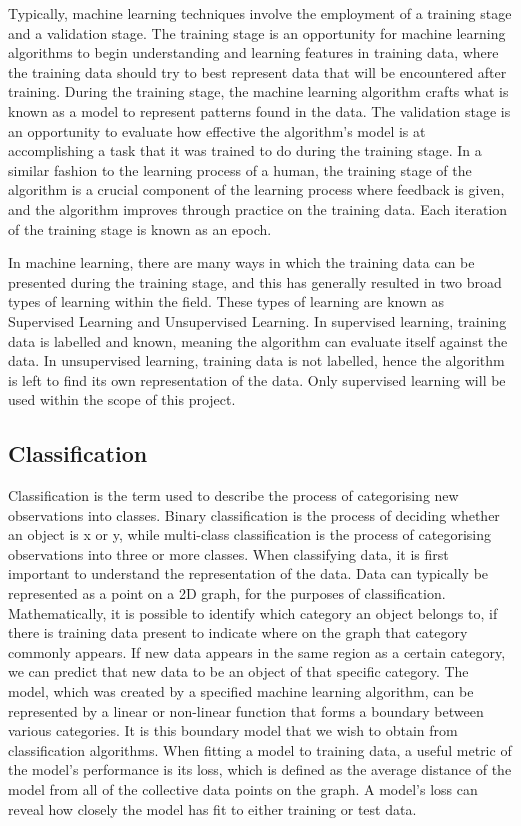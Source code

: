 \documentclass{l4proj}
\begin{document}
Typically, machine learning techniques involve the employment of a training stage and a validation stage.
The training stage is an opportunity for machine learning algorithms to begin understanding and learning features in training data, where the training data should try to best represent data that will be encountered after training.
During the training stage, the machine learning algorithm crafts what is known as a model to represent patterns found in the data.
The validation stage is an opportunity to evaluate how effective the algorithm's model is at accomplishing a task that it was trained to do during the training stage.
In a similar fashion to the learning process of a human, the training stage of the algorithm is a crucial component of the learning process where feedback is given, and the algorithm improves through practice on the training data.
Each iteration of the training stage is known as an epoch.

In machine learning, there are many ways in which the training data can be presented during the training stage, and this has generally resulted in two broad types of learning within the field. 
These types of learning are known as Supervised Learning and Unsupervised Learning. 
In supervised learning, training data is labelled and known, meaning the algorithm can evaluate itself against the data. 
In unsupervised learning, training data is not labelled, hence the algorithm is left to find its own representation of the data.
Only supervised learning will be used within the scope of this project. 

\subsection{Classification}
Classification is the term used to describe the process of categorising new observations into classes.
Binary classification is the process of deciding whether an object is x or y, while multi-class classification is the process of categorising observations into three or more classes.
When classifying data, it is first important to understand the representation of the data.
Data can typically be represented as a point on a 2D graph, for the purposes of classification.
Mathematically, it is possible to identify which category an object belongs to, if there is training data present to indicate where on the graph that category commonly appears.
If new data appears in the same region as a certain category, we can predict that new data to be an object of that specific category.
The model, which was created by a specified machine learning algorithm, can be represented by a linear or non-linear function that forms a boundary between various categories. 
It is this boundary model that we wish to obtain from classification algorithms.
When fitting a model to training data, a useful metric of the model's performance is its loss, which is defined as the average distance of the model from all of the collective data points on the graph.
A model's loss can reveal how closely the model has fit to either training or test data.
\end{document}

